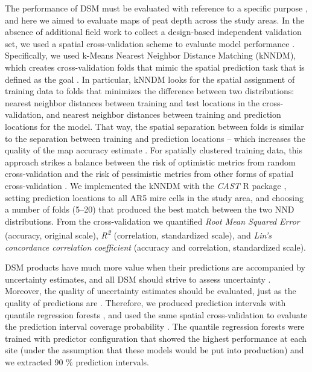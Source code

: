 \documentclass[soil, manuscript]{copernicus}
\begin{document}
The performance of DSM must be evaluated with reference to a specific purpose \citep[i.e., map vs.~model validation, interpolation vs.~extrapolation,][]{robertsCrossvalidationStrategiesData2017, milaNearestNeighbourDistance2022}, and here we aimed to evaluate maps of peat depth across the study areas.
In the absence of additional field work to collect a design-based independent validation set, we used a spatial cross-validation scheme to evaluate model performance \citep{wadouxSpatialCrossvalidationNot2021, meyerMachineLearningbasedGlobal2022}.
Specifically, we used k-Means Nearest Neighbor Distance Matching (kNNDM), which creates cross-validation folds that mimic the spatial prediction task that is defined as the goal \citep{linnenbrinkKNNDMCVKfold2024}.
In particular, kNNDM looks for the spatial assignment of training data to folds that minimizes the difference between two distributions: nearest neighbor distances between training and test locations in the cross-validation, and nearest neighbor distances between training and prediction locations for the model.
That way, the spatial separation between folds is similar to the separation between training and prediction locations -- which increases the quality of the map accuracy estimate \citep{linnenbrinkKNNDMCVKfold2024}.
For spatially clustered training data, this approach strikes a balance between the risk of optimistic metrics from random cross-validation and the risk of pessimistic metrics from other forms of spatial cross-validation \citep{wadouxSpatialCrossvalidationNot2021}.
We implemented the kNNDM with the \emph{CAST} R package \citep[v.1.0.2,][]{meyerCASTPackageTraining2024}, setting prediction locations to all AR5 mire cells in the study area, and choosing a number of folds (5--20) that produced the best match between the two NND distributions.
From the cross-validation we quantified \emph{Root Mean Squared Error} (accuracy, original scale), \emph{R\textsuperscript{2}} (correlation, standardized scale), and \emph{Lin's concordance correlation coefficient} (accuracy and correlation, standardized scale).

DSM products have much more value when their predictions are accompanied by uncertainty estimates, and all DSM should strive to assess uncertainty \citep{arrouaysImpressionsDigitalSoil2020, wadouxMachineLearningDigital2020}.
Moreover, the quality of uncertainty estimates should be evaluated, just as the quality of predictions are \citep{heuvelinkSpatialStatisticsSoil2022}.
Therefore, we produced prediction intervals with quantile regression forests \citep{meinshausenQuantileRegressionForests2006}, and used the same spatial cross-validation to evaluate the prediction interval coverage probability \citep{shresthaMachineLearningApproaches2006}.
The quantile regression forests were trained with predictor configuration that showed the highest performance at each site (under the assumption that these models would be put into production) and we extracted 90 \% prediction intervals.
\end{document}
